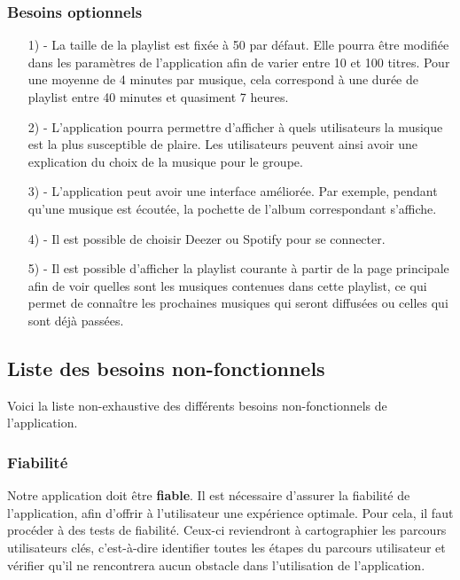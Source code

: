 \documentclass[12pt, openany]{report}
\begin{document}
\subsubsection{Besoins optionnels}
\begin{itemize}
\item[1) -]La taille de la playlist est fixée à 50 par défaut. Elle pourra être modifiée dans les paramètres de l'application afin de varier entre 10 et 100 titres. Pour une moyenne de 4 minutes par musique, cela correspond à une durée de playlist entre 40 minutes et quasiment 7 heures.

\item[2) -]L'application pourra permettre d'afficher à quels utilisateurs la musique est la plus susceptible de plaire. Les utilisateurs peuvent ainsi avoir une explication du choix de la musique pour le groupe.

\item[3) -]L'application peut avoir une interface améliorée. Par exemple, pendant qu'une musique est écoutée, la pochette de l'album correspondant s'affiche.

\item[4) -]Il est possible de choisir Deezer ou Spotify pour se connecter.

\item[5) -]Il est possible d'afficher la playlist courante à partir de la page principale afin de voir quelles sont les musiques contenues dans cette playlist, ce qui permet de connaître les prochaines musiques qui seront diffusées ou celles qui sont déjà passées.

\end{itemize}

\subsection{Liste des besoins non-fonctionnels}

Voici la liste non-exhaustive des différents besoins non-fonctionnels de l'application.

\subsubsection{Fiabilité}

Notre application doit être \textbf{fiable}. Il est nécessaire d'assurer la fiabilité de l'application, afin d'offrir à l'utilisateur une expérience optimale. Pour cela, il faut procéder à des tests de fiabilité. Ceux-ci reviendront à cartographier les parcours utilisateurs clés, c'est-à-dire identifier toutes les étapes du parcours utilisateur et vérifier qu'il ne rencontrera aucun obstacle dans l'utilisation de l'application. 
\end{document}
